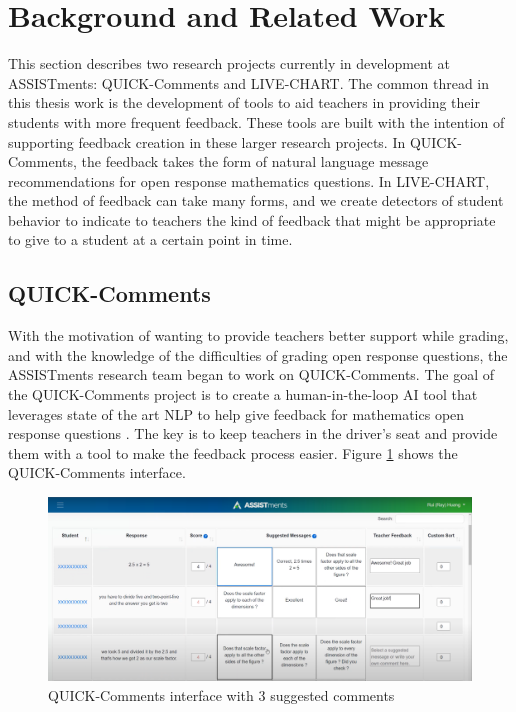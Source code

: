 \documentclass[12pt]{report}
\begin{document}
\section{Background and Related Work}

This section describes two research projects currently in development at ASSISTments: QUICK-Comments and LIVE-CHART. The common thread in this thesis work is the development of tools to aid teachers in providing their students with more frequent feedback. These tools are built with the intention of supporting feedback creation in these larger research projects. In QUICK-Comments, the feedback takes the form of natural language message recommendations for open response mathematics questions. In LIVE-CHART, the method of feedback can take many forms, and we create detectors of student behavior to indicate to teachers the kind of feedback that might be appropriate to give to a student at a certain point in time.

\subsection{QUICK-Comments}

With the motivation of wanting to provide teachers better support while grading, and with the knowledge of the difficulties of grading open response questions, the ASSISTments research team began to work on QUICK-Comments. The goal of the QUICK-Comments project is to create a human-in-the-loop AI tool that leverages state of the art NLP to help give feedback for mathematics open response questions \cite{quick_comments_nth}. The key is to keep teachers in the driver's seat and provide them with a tool to make the feedback process easier. Figure \ref{img:quick_comments_new} shows the QUICK-Comments interface.

\begin{figure}[ht] 
    \centering
    \includegraphics[width=\textwidth]{images/quick_comments_new.png}
    \caption{QUICK-Comments interface with 3 suggested comments}
    \label{img:quick_comments_new}
\end{figure}
\end{document}
